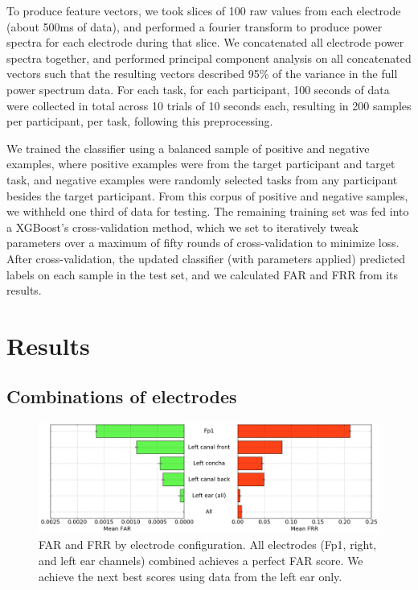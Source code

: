 \documentclass{sigchi}
\begin{document}
To produce feature vectors, we took slices of 100 raw values from each electrode (about 500ms of data), and performed a fourier transform to produce power spectra for each electrode during that slice. We concatenated all electrode power spectra together, and performed principal component analysis on all concatenated vectors such that the resulting vectors described 95\% of the variance in the full power spectrum data. For each task, for each participant, 100 seconds of data were collected in total across 10 trials of 10 seconds each, resulting in 200 samples per participant, per task, following this preprocessing.

We trained the classifier using a balanced sample of positive and negative examples, where positive examples were from the target participant and target task, and negative examples were randomly selected tasks from any participant besides the target participant. From this corpus of positive and negative samples, we withheld one third of data for testing. The remaining training set was fed into a XGBoost's cross-validation method, which we set to iteratively tweak parameters over a maximum of fifty rounds of cross-validation to minimize loss. After cross-validation, the updated classifier (with parameters applied) predicted labels on each sample in the test set, and we calculated FAR and FRR from its results.

\section{Results}
\subsection{Combinations of electrodes}

\begin{figure}[t]
\centering
\includegraphics[width=.9\linewidth]{./figures/mean-far-and-frr-by-electrode-config.png}
\caption{FAR and FRR by electrode configuration. All electrodes (Fp1, right, and left ear channels) combined achieves a perfect FAR score. We achieve the next best scores using data from the left ear only.}
\label{fig:meanByElectrode}
\end{figure}
\end{document}

